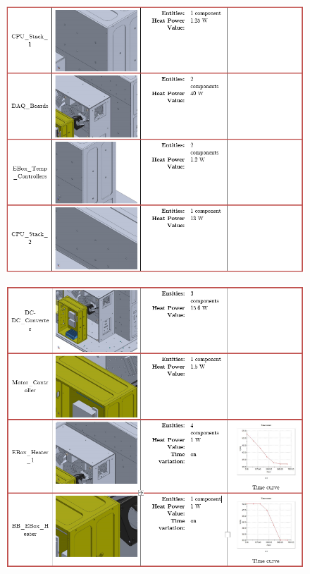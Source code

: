 \begin{figure}
    \centering
    \includegraphics[width=\textwidth]{thermal_load_images/ascent_pt2_TL_images/ascesnt_pt2_3.PNG}
\end{figure}

\begin{figure}
    \centering
    \includegraphics[width=\textwidth]{thermal_load_images/ascent_pt2_TL_images/ascesnt_pt2_4.PNG}
\end{figure}

